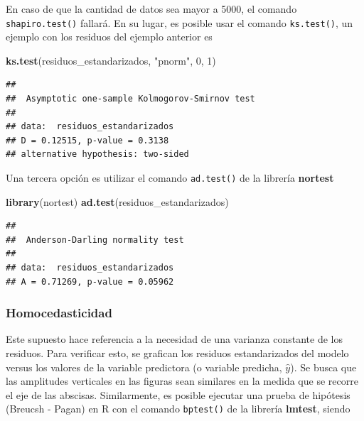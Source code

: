 \documentclass[
  11pt,
]{book}
\newenvironment{Shaded}{\begin{snugshade}}{\end{snugshade}}
\newcommand{\DecValTok}[1]{\textcolor[rgb]{0.00,0.00,0.81}{#1}}
\newcommand{\FunctionTok}[1]{\textcolor[rgb]{0.13,0.29,0.53}{\textbf{#1}}}
\newcommand{\NormalTok}[1]{#1}
\newcommand{\StringTok}[1]{\textcolor[rgb]{0.31,0.60,0.02}{#1}}
\theoremstyle{definition}
\theoremstyle{definition}
\theoremstyle{definition}
\theoremstyle{definition}
\theoremstyle{remark}
\begin{document}
En caso de que la cantidad de datos sea mayor a 5000, el comando \texttt{shapiro.test()} fallará. En su lugar, es posible usar el comando \texttt{ks.test()}, un ejemplo con los residuos del ejemplo anterior es

\begin{Shaded}
\begin{Highlighting}[]
\FunctionTok{ks.test}\NormalTok{(residuos\_estandarizados, }\StringTok{"pnorm"}\NormalTok{, }\DecValTok{0}\NormalTok{, }\DecValTok{1}\NormalTok{)}
\end{Highlighting}
\end{Shaded}

\begin{verbatim}
## 
##  Asymptotic one-sample Kolmogorov-Smirnov test
## 
## data:  residuos_estandarizados
## D = 0.12515, p-value = 0.3138
## alternative hypothesis: two-sided
\end{verbatim}

Una tercera opción es utilizar el comando \texttt{ad.test()} de la librería \textbf{nortest}

\begin{Shaded}
\begin{Highlighting}[]
\FunctionTok{library}\NormalTok{(nortest)}
\FunctionTok{ad.test}\NormalTok{(residuos\_estandarizados)}
\end{Highlighting}
\end{Shaded}

\begin{verbatim}
## 
##  Anderson-Darling normality test
## 
## data:  residuos_estandarizados
## A = 0.71269, p-value = 0.05962
\end{verbatim}

\subsubsection{Homocedasticidad}\label{regresion-lineal-simple-supuestos-homocedasticidad}

Este supuesto hace referencia a la necesidad de una varianza constante de los residuos. Para verificar esto, se grafican los residuos estandarizados del modelo versus los valores de la variable predictora (o variable predicha, \(\widehat{y}\)). Se busca que las amplitudes verticales en las figuras sean similares en la medida que se recorre el eje de las abscisas. Similarmente, es posible ejecutar una prueba de hipótesis (Breucsh - Pagan) en R con el comando \texttt{bptest()} de la librería \textbf{lmtest}, siendo
\end{document}
